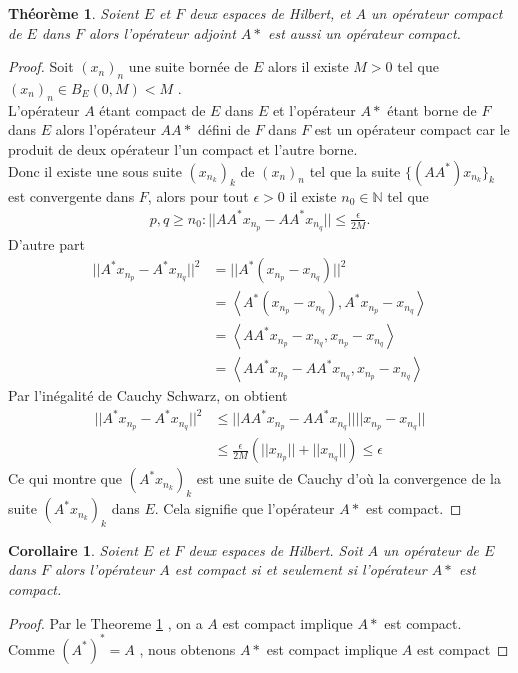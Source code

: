 \documentclass{report}
\newtheorem{The}{Théorème}[subsection]
\newtheorem{Cor}{Corollaire}[subsection]
\begin{document}
{\begin{The} \label{The:100} Soient $E$ et $F$ deux espaces de Hilbert, et $A$ un opérateur compact de $E$ dans $F$ alors l'opérateur adjoint $A*$ est aussi un opérateur compact. \\
\end{The}
\begin{proof}
Soit $(x_n)_n$ une suite bornée de $E$ alors il existe $M > 0$ tel que $(x_n)_n \in B_E(0,M) < M$ .\\
L'opérateur $A$ étant compact de $E$ dans $E$ et l'opérateur $A*$ étant borne de $F$ dans $E$ alors l'opérateur $A A*$ défini de $F$ dans $F$ est un opérateur compact car le produit de deux opérateur l'un compact et l'autre borne.\\ 
Donc il existe une sous suite $(x_{n_k})_k$ de $(x_n)_n$ tel que la suite $\{(A A^*)x_{n_k}\}_k$ est convergente dans $F$, alors pour tout $\epsilon > 0$ il existe $n_0 \in \mathbb{N}$ tel que 
					\begin{align*}
					 p,q \ge n_0 : ||AA^* x_{n_p} - A A^* x_{n_q} || \le \frac{\epsilon}{2M} .
					\end{align*}
D'autre part 
					\begin{align*}
					 ||A^* x_{n_p} - A^*x_{n_q}||^2 &= ||A^*(x_{n_p} - x_{n_q})||^2 \\
					 &= \left< A^*(x_{n_p} - x_{n_q}), A^*x_{n_p} - x_{n_q} \right> \\
					 &= \left< AA^*x_{n_p} - x_{n_q},x_{n_p} - x_{n_q} \right> \\
					 &= \left< AA^*x_{n_p} - AA^*x_{n_q},x_{n_p} - x_{n_q} \right> 
					\end{align*}
Par l'inégalité de Cauchy Schwarz, on obtient 
					\begin{align*}
					 ||A^*x_{n_p} - A^*x_{n_q}||^2 &\le ||AA^* x_{n_p} - AA^*x_{n_q}|| ||x_{n_p} - x_{n_q}|| \\
					 &\le \frac{\epsilon}{2M} (||x_{n_p}|| + ||x_{n_q}||) \le \epsilon 
					\end{align*}
Ce qui montre que $(A^* x_{n_k})_k$ est une suite de Cauchy d'où la convergence de la suite $(A^*x_{n_k})_k$ dans $E$. Cela signifie que l'opérateur $A*$ est compact.
\end{proof}



\begin{Cor} \label{Cor:100} Soient $E$ et $F$ deux espaces de Hilbert. Soit $A$ un opérateur de $E$ dans $F$ alors l'opérateur $A$ est compact si et seulement si l'opérateur $A*$ est compact.\\
\end{Cor}
\begin{proof}
Par le Theoreme \ref{The:100} , on a $A$ est compact implique $A*$ est compact. Comme $(A^*)^* = A$ , nous obtenons $A*$ est compact implique $A$ est compact 
\end{proof}



}
\end{document}
